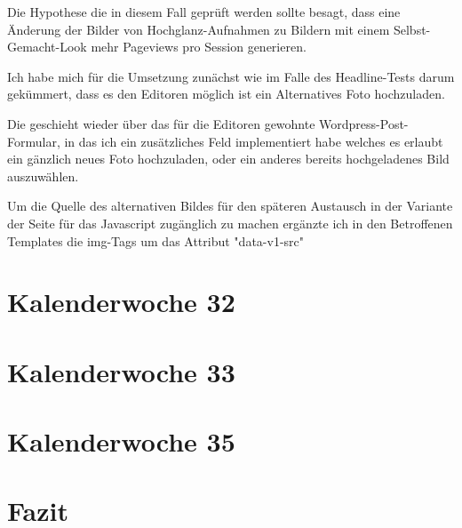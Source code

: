 \documentclass[11pt]{article} %
\begin{document}
Die Hypothese die in diesem Fall geprüft werden sollte besagt, dass eine Änderung der Bilder von Hochglanz-Aufnahmen zu Bildern mit einem Selbst-Gemacht-Look mehr Pageviews pro Session generieren.

Ich habe mich für die Umsetzung zunächst wie im Falle des Headline-Tests darum gekümmert, dass es den Editoren möglich ist ein Alternatives Foto hochzuladen.

Die geschieht wieder über das für die Editoren gewohnte Wordpress-Post-Formular, in das ich ein zusätzliches Feld implementiert habe welches es erlaubt ein gänzlich neues Foto hochzuladen, oder ein anderes bereits hochgeladenes Bild auszuwählen.

Um die Quelle des alternativen Bildes für den späteren Austausch in der Variante der Seite für das Javascript zugänglich zu machen ergänzte ich in den Betroffenen Templates die img-Tags um das Attribut "data-v1-src"

\section{Kalenderwoche 32} \label{sec:kw3}
\section{Kalenderwoche 33} \label{sec:kw3}
\section{Kalenderwoche 35} \label{sec:kw3}
\section{Fazit} \label{sec:faz}

\newpage


\newpage

\end{document}
